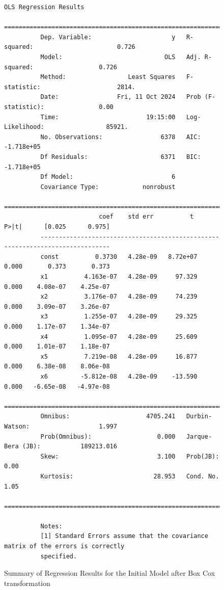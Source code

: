 \documentclass[twocolumn]{article} %
\begin{document}
\begin{figure}[ht]
  \centering
  \begin{Verbatim}[commandchars=\\\{\}]
                                      OLS Regression Results
          ==============================================================================
          Dep. Variable:                      y   R-squared:                       0.726
          Model:                            OLS   Adj. R-squared:                  0.726
          Method:                 Least Squares   F-statistic:                     2814.
          Date:                Fri, 11 Oct 2024   Prob (F-statistic):               0.00
          Time:                        19:15:00   Log-Likelihood:                 85921.
          No. Observations:                6378   AIC:                        -1.718e+05
          Df Residuals:                    6371   BIC:                        -1.718e+05
          Df Model:                           6
          Covariance Type:            nonrobust
          ==============================================================================
                          coef    std err          t      P>|t|      [0.025      0.975]
          ------------------------------------------------------------------------------
          const          0.3730   4.28e-09   8.72e+07      0.000       0.373       0.373
          x1          4.163e-07   4.28e-09     97.329      0.000    4.08e-07    4.25e-07
          x2          3.176e-07   4.28e-09     74.239      0.000    3.09e-07    3.26e-07
          x3          1.255e-07   4.28e-09     29.325      0.000    1.17e-07    1.34e-07
          x4          1.095e-07   4.28e-09     25.609      0.000    1.01e-07    1.18e-07
          x5          7.219e-08   4.28e-09     16.877      0.000    6.38e-08    8.06e-08
          x6         -5.812e-08   4.28e-09    -13.590      0.000   -6.65e-08   -4.97e-08
          ==============================================================================
          Omnibus:                     4705.241   Durbin-Watson:                   1.997
          Prob(Omnibus):                  0.000   Jarque-Bera (JB):           189213.016
          Skew:                           3.100   Prob(JB):                         0.00
          Kurtosis:                      28.953   Cond. No.                         1.05
          ==============================================================================
          
          Notes:
          [1] Standard Errors assume that the covariance matrix of the errors is correctly
          specified.
  \end{Verbatim}
  \caption{Summary of Regression Results for the Initial Model after Box Cox transformation}
  \label{fig:boxcox-model-summary}
\end{figure}
\end{document}
